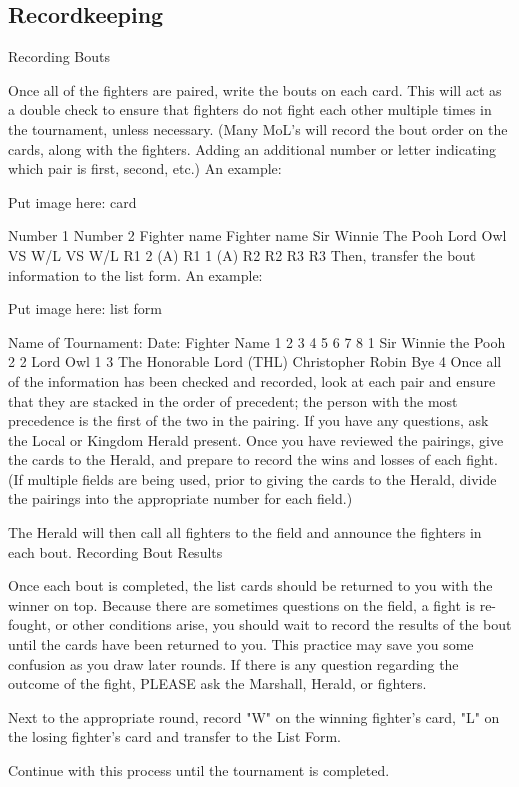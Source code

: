 \documentclass{article}
\begin{document}
\subsection{Recordkeeping}
Recording Bouts

Once all of the fighters are paired, write the bouts on each card. This will act as a double check to ensure
that fighters do not fight each other multiple times in the tournament, unless necessary. (Many MoL’s will
record the bout order on the cards, along with the fighters. Adding an additional number or letter
indicating which pair is first, second, etc.) An example:

Put image here: card

Number 1 Number 2
Fighter name Fighter name
Sir
Winnie The Pooh Lord Owl
VS W/L VS W/L
R1 2 (A) R1 1 (A)
R2 R2
R3 R3
Then, transfer the bout information to the list form. An example:

Put image here: list form

Name of Tournament: Date:
Fighter Name 1 2 3 4 5 6 7 8
1 Sir Winnie the Pooh 2
2 Lord Owl 1
3
The Honorable Lord (THL)
Christopher Robin Bye
4
Once all of the information has been checked and recorded, look at each pair and ensure that they are
stacked in the order of precedent; the person with the most precedence is the first of the two in the pairing.
If you have any questions, ask the Local or Kingdom Herald present. Once you have reviewed the
pairings, give the cards to the Herald, and prepare to record the wins and losses of each fight. (If multiple
fields are being used, prior to giving the cards to the Herald, divide the pairings into the appropriate
number for each field.)

The Herald will then call all fighters to the field and announce the fighters in each bout.
Recording Bout Results

Once each bout is completed, the list cards should be returned to you with the winner on top. Because
there are sometimes questions on the field, a fight is re-fought, or other conditions arise, you should wait
to record the results of the bout until the cards have been returned to you. This practice may save you
some confusion as you draw later rounds. If there is any question regarding the outcome of the fight,
PLEASE ask the Marshall, Herald, or fighters.

Next to the appropriate round, record "W" on the winning fighter’s card, "L" on the losing fighter’s card
and transfer to the List Form.

Continue with this process until the tournament is completed.
\end{document}
